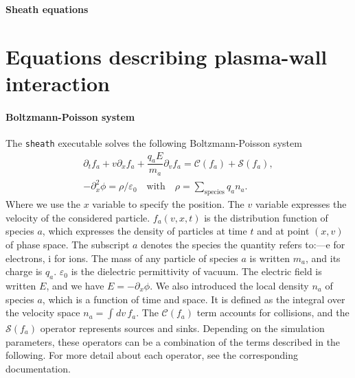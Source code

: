 \documentclass[11pt]{article}
\begin{document}
\begin{center}
    \LARGE \textbf{Sheath equations} \\
    \vspace{0.8cm} 
\end{center}


\section{Equations describing plasma-wall interaction}
\paragraph{Boltzmann-Poisson system} The \texttt{sheath} executable solves the following Boltzmann-Poisson system
%
\begin{eqnarray}\label{eq:boltzmann_eq_ref}
  \partial_{t} f_a + v \partial_{x} f_a + \dfrac{q_a E}{m_a} \partial_{v} f_a = \mathcal{C}(f_a) + \mathcal{S}(f_a), \\[0.2cm]
  -\partial_{x}^2 \phi = \rho / \varepsilon_0 \quad \text{with} \quad \rho = \sum\limits_{\mathrm{species}}^{} q_a n_a.
\end{eqnarray}
%
Where we use the $x$ variable to specify the position. The $v$ variable expresses the velocity of the considered particle. $f_a(v,x,t)$ is the distribution function of species $a$, which expresses the density of particles at time $t$ and at point $(x,v)$ of phase space.  The subscript $a$ denotes the species the quantity refers to:---$\mathrm{e}$ for electrons, $\mathrm{i}$ for ions. The mass of any particle of species $a$ is written $m_a$, and its charge is $q_a$. $\varepsilon_0$ is the dielectric permittivity of vacuum. The electric field is written $E$, and we have $E = -\partial_{x} \phi$. We also introduced the local density $n_a$ of species $a$, which is a function of time and space. It is defined as the integral over the velocity space $n_a = \int_{}^{} dv \, f_a$. The $\mathcal{C}(f_a)$ term accounts for collisions, and the $\mathcal{S}(f_a)$ operator represents sources and sinks. Depending on the simulation parameters, these operators can be a combination of the terms described in the following. For more detail about each operator, see the corresponding documentation. \\
\end{document}
